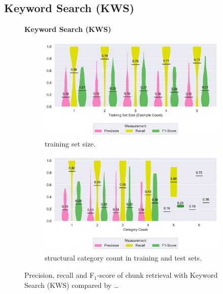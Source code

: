 \subsection{Keyword Search (KWS)}
\label{sec:r:kws}
\begin{figure}
\centering
    \textbf{Keyword Search (KWS)}\par\medskip
\begin{subfigure}[b]{\columnwidth}
		\centering
		\includegraphics[width=\columnwidth,
		clip]{img/big-study/recall-precision-examplecount-KWS.pdf}
		\caption{training set size.}
		\label{fig:recall-precision-examplecount-KWS}
\end{subfigure}\hspace{\fill}
\begin{subfigure}[b]{\columnwidth}
		\centering
		\includegraphics[width=\columnwidth,
		clip]{img/big-study/recall-precision-categorycount-KWS.pdf}
		\caption{structural category count
		in training and test sets.}
		\label{fig:recall-precision-categorycount-KWS}
\end{subfigure}
\caption{Precision, recall and F$_{1}$-score of chunk retrieval with
Keyword Search (KWS) compared by \ldots}
\end{figure}


